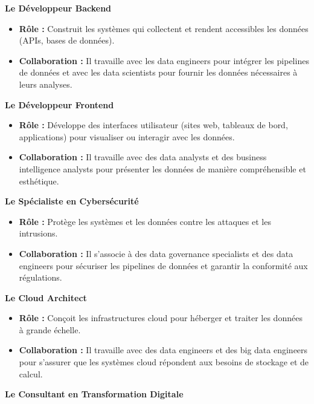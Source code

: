 \documentclass[
  letterpaper,
  DIV=11,
  numbers=noendperiod]{scrartcl}
\providecommand{\tightlist}{%
  \setlength{\itemsep}{0pt}\setlength{\parskip}{0pt}}\usepackage{longtable,booktabs,array}
\begin{document}
\textbf{Le Développeur Backend}

\begin{itemize}
\tightlist
\item
  \textbf{Rôle :} Construit les systèmes qui collectent et rendent
  accessibles les données (APIs, bases de données).
\item
  \textbf{Collaboration :} Il travaille avec les data engineers pour
  intégrer les pipelines de données et avec les data scientists pour
  fournir les données nécessaires à leurs analyses.
\end{itemize}

\textbf{Le Développeur Frontend}

\begin{itemize}
\tightlist
\item
  \textbf{Rôle :} Développe des interfaces utilisateur (sites web,
  tableaux de bord, applications) pour visualiser ou interagir avec les
  données.
\item
  \textbf{Collaboration :} Il travaille avec des data analysts et des
  business intelligence analysts pour présenter les données de manière
  compréhensible et esthétique.
\end{itemize}

\textbf{Le Spécialiste en Cybersécurité}

\begin{itemize}
\tightlist
\item
  \textbf{Rôle :} Protège les systèmes et les données contre les
  attaques et les intrusions.
\item
  \textbf{Collaboration :} Il s'associe à des data governance
  specialists et des data engineers pour sécuriser les pipelines de
  données et garantir la conformité aux régulations.
\end{itemize}

\textbf{Le Cloud Architect}

\begin{itemize}
\tightlist
\item
  \textbf{Rôle :} Conçoit les infrastructures cloud pour héberger et
  traiter les données à grande échelle.
\item
  \textbf{Collaboration :} Il travaille avec des data engineers et des
  big data engineers pour s'assurer que les systèmes cloud répondent aux
  besoins de stockage et de calcul.
\end{itemize}

\textbf{Le Consultant en Transformation Digitale}
\end{document}
